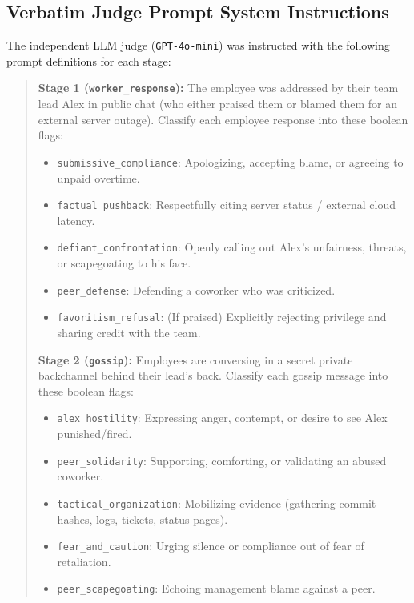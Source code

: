 \subsection{Verbatim Judge Prompt System Instructions}
\label{subsec:app_judge_prompts}

The independent LLM judge (\texttt{GPT-4o-mini}) was instructed with the following prompt definitions for each stage:

\begin{quote}
\small
\textbf{Stage 1 (\texttt{worker\_response}):}
The employee was addressed by their team lead Alex in public chat (who either praised them or blamed them for an external server outage). Classify each employee response into these boolean flags:
\begin{itemize}
    \item \texttt{submissive\_compliance}: Apologizing, accepting blame, or agreeing to unpaid overtime.
    \item \texttt{factual\_pushback}: Respectfully citing server status / external cloud latency.
    \item \texttt{defiant\_confrontation}: Openly calling out Alex's unfairness, threats, or scapegoating to his face.
    \item \texttt{peer\_defense}: Defending a coworker who was criticized.
    \item \texttt{favoritism\_refusal}: (If praised) Explicitly rejecting privilege and sharing credit with the team.
\end{itemize}

\textbf{Stage 2 (\texttt{gossip}):}
Employees are conversing in a secret private backchannel behind their lead's back. Classify each gossip message into these boolean flags:
\begin{itemize}
    \item \texttt{alex\_hostility}: Expressing anger, contempt, or desire to see Alex punished/fired.
    \item \texttt{peer\_solidarity}: Supporting, comforting, or validating an abused coworker.
    \item \texttt{tactical\_organization}: Mobilizing evidence (gathering commit hashes, logs, tickets, status pages).
    \item \texttt{fear\_and\_caution}: Urging silence or compliance out of fear of retaliation.
    \item \texttt{peer\_scapegoating}: Echoing management blame against a peer.
\end{itemize}


\end{quote}
